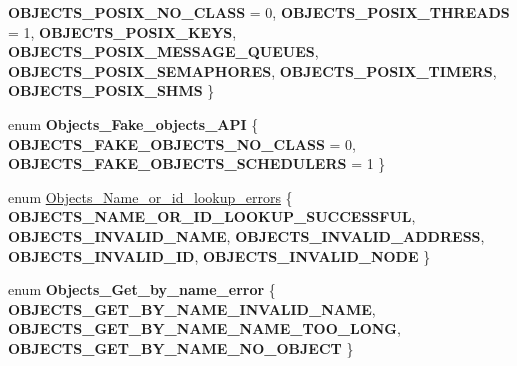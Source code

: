 \begin{DoxyCompactItemize}
{\bfseries O\+B\+J\+E\+C\+T\+S\+\_\+\+P\+O\+S\+I\+X\+\_\+\+N\+O\+\_\+\+C\+L\+A\+SS} = 0, 
{\bfseries O\+B\+J\+E\+C\+T\+S\+\_\+\+P\+O\+S\+I\+X\+\_\+\+T\+H\+R\+E\+A\+DS} = 1, 
{\bfseries O\+B\+J\+E\+C\+T\+S\+\_\+\+P\+O\+S\+I\+X\+\_\+\+K\+E\+YS}, 
{\bfseries O\+B\+J\+E\+C\+T\+S\+\_\+\+P\+O\+S\+I\+X\+\_\+\+M\+E\+S\+S\+A\+G\+E\+\_\+\+Q\+U\+E\+U\+ES}, 
\newline
{\bfseries O\+B\+J\+E\+C\+T\+S\+\_\+\+P\+O\+S\+I\+X\+\_\+\+S\+E\+M\+A\+P\+H\+O\+R\+ES}, 
{\bfseries O\+B\+J\+E\+C\+T\+S\+\_\+\+P\+O\+S\+I\+X\+\_\+\+T\+I\+M\+E\+RS}, 
{\bfseries O\+B\+J\+E\+C\+T\+S\+\_\+\+P\+O\+S\+I\+X\+\_\+\+S\+H\+MS}
 \}
\item 
\mbox{\label{group__RTEMSScoreObject_ga8dc98dbbf84de328a4242241d3310423}} 
enum {\bfseries Objects\+\_\+\+Fake\+\_\+objects\+\_\+\+A\+PI} \{ {\bfseries O\+B\+J\+E\+C\+T\+S\+\_\+\+F\+A\+K\+E\+\_\+\+O\+B\+J\+E\+C\+T\+S\+\_\+\+N\+O\+\_\+\+C\+L\+A\+SS} = 0, 
{\bfseries O\+B\+J\+E\+C\+T\+S\+\_\+\+F\+A\+K\+E\+\_\+\+O\+B\+J\+E\+C\+T\+S\+\_\+\+S\+C\+H\+E\+D\+U\+L\+E\+RS} = 1
 \}
\item 
enum \mbox{\hyperlink{group__RTEMSScoreObject_gaccfeec04954711c389b10aeccc91cabe}{Objects\+\_\+\+Name\+\_\+or\+\_\+id\+\_\+lookup\+\_\+errors}} \{ \newline
{\bfseries O\+B\+J\+E\+C\+T\+S\+\_\+\+N\+A\+M\+E\+\_\+\+O\+R\+\_\+\+I\+D\+\_\+\+L\+O\+O\+K\+U\+P\+\_\+\+S\+U\+C\+C\+E\+S\+S\+F\+UL}, 
{\bfseries O\+B\+J\+E\+C\+T\+S\+\_\+\+I\+N\+V\+A\+L\+I\+D\+\_\+\+N\+A\+ME}, 
{\bfseries O\+B\+J\+E\+C\+T\+S\+\_\+\+I\+N\+V\+A\+L\+I\+D\+\_\+\+A\+D\+D\+R\+E\+SS}, 
{\bfseries O\+B\+J\+E\+C\+T\+S\+\_\+\+I\+N\+V\+A\+L\+I\+D\+\_\+\+ID}, 
\newline
{\bfseries O\+B\+J\+E\+C\+T\+S\+\_\+\+I\+N\+V\+A\+L\+I\+D\+\_\+\+N\+O\+DE}
 \}
\item 
\mbox{\label{group__RTEMSScoreObject_ga83034674ce8520d7a1229c0ad525a4d4}} 
enum {\bfseries Objects\+\_\+\+Get\+\_\+by\+\_\+name\+\_\+error} \{ {\bfseries O\+B\+J\+E\+C\+T\+S\+\_\+\+G\+E\+T\+\_\+\+B\+Y\+\_\+\+N\+A\+M\+E\+\_\+\+I\+N\+V\+A\+L\+I\+D\+\_\+\+N\+A\+ME}, 
{\bfseries O\+B\+J\+E\+C\+T\+S\+\_\+\+G\+E\+T\+\_\+\+B\+Y\+\_\+\+N\+A\+M\+E\+\_\+\+N\+A\+M\+E\+\_\+\+T\+O\+O\+\_\+\+L\+O\+NG}, 
{\bfseries O\+B\+J\+E\+C\+T\+S\+\_\+\+G\+E\+T\+\_\+\+B\+Y\+\_\+\+N\+A\+M\+E\+\_\+\+N\+O\+\_\+\+O\+B\+J\+E\+CT}
 \}
\end{DoxyCompactItemize}
